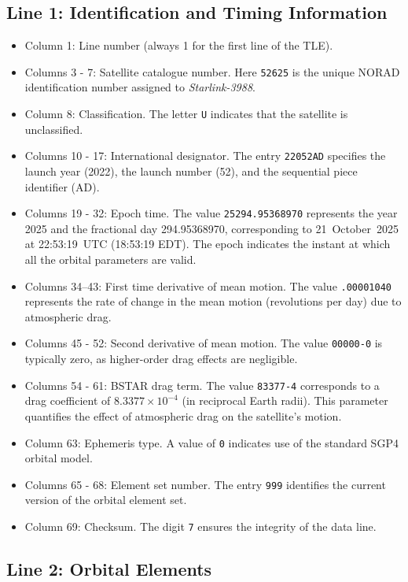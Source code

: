 \documentclass{article}
\begin{document}
\subsection*{Line 1: Identification and Timing Information}

\begin{itemize}
    \item Column 1: Line number (always 1 for the first line of the TLE).
    \item Columns 3 - 7: Satellite catalogue number. Here \texttt{52625} is the unique NORAD identification number assigned to \textit{Starlink-3988}.
    \item Column 8: Classification. The letter \texttt{U} indicates that the satellite is unclassified.
    \item Columns 10 - 17: International designator. The entry \texttt{22052AD} specifies the launch year (2022), the launch number (52), and the sequential piece identifier (AD).
    \item Columns 19 - 32: Epoch time. The value \texttt{25294.95368970} represents the year 2025 and the fractional day 294.95368970, corresponding to 21~October~2025 at 22:53:19~UTC (18:53:19 EDT). The epoch indicates the instant at which all the orbital parameters are valid.
    \item Columns 34--43: First time derivative of mean motion. The value \texttt{.00001040} represents the rate of change in the mean motion (revolutions per day) due to atmospheric drag.
    \item Columns 45 - 52: Second derivative of mean motion. The value \texttt{00000-0} is typically zero, as higher-order drag effects are negligible.
    \item Columns 54 - 61: BSTAR drag term. The value \texttt{83377-4} corresponds to a drag coefficient of \(8.3377\times10^{-4}\) (in reciprocal Earth radii). This parameter quantifies the effect of atmospheric drag on the satellite’s motion.
    \item Column 63: Ephemeris type. A value of \texttt{0} indicates use of the standard SGP4 orbital model.
    \item Columns 65 - 68: Element set number. The entry \texttt{999} identifies the current version of the orbital element set.
    \item Column 69: Checksum. The digit \texttt{7} ensures the integrity of the data line.
\end{itemize}

\subsection*{Line 2: Orbital Elements}
\end{document}
